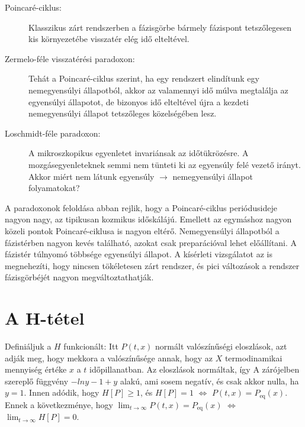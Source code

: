 \begin{description}
    \begin{description}
     \item[Poincaré-ciklus:] Klasszikus zárt rendszerben a fázisgörbe bármely fázispont tetszőlegesen kis környezetébe visszatér elég idő elteltével. 
     \item[Zermelo-féle visszatérési paradoxon:] Tehát a Poincaré-ciklus szerint, ha egy rendszert elindítunk egy nemegyensúlyi állapotból, akkor az valamennyi idő múlva megtalálja az egyensúlyi állapotot, de bizonyos idő elteltével újra a kezdeti nemegyensúlyi állapot tetszőleges közelségében lesz. 
     \item[Loschmidt-féle paradoxon:] A mikroszkopikus egyenletet invariánsak az időtükrözésre.
   A mozgásegyenleteknek semmi nem tünteti ki az egyensúly felé vezető irányt.
   Akkor miért nem látunk egyensúly $\rightarrow$ nemegyensúlyi állapot folyamatokat?
    \end{description}
    
    A paradoxonok feloldása abban rejlik, hogy a Poincaré-ciklus periódusideje nagyon nagy, az tipikusan kozmikus időskálájú.
   Emellett az egymáshoz nagyon közeli pontok Poincaré-ciklusa is nagyon eltérő.
   Nemegyensúlyi állapotból a fázistérben nagyon kevés található, azokat csak preparációval lehet előállítani.
   A fázistér túlnyomó többsége egyensúlyi állapot.
   A kísérleti vizsgálatot az is megnehezíti, hogy nincsen tökéletesen zárt rendszer, és pici változások a rendszer fázisgörbéjét nagyon megváltoztathatják. 
  \end{description}
  
 \section{A H-tétel}
  
  Definiáljuk a $H$ funkcionált:
  Itt $P(t,x)$ normált valószínűségi eloszlások, azt adják meg, hogy mekkora a valószínűsége annak, hogy az $X$ termodinamikai mennyiség értéke $x$ a $t$ időpillanatban.
   Az eloszlások normáltak, így 
  A zárójelben szereplő függvény $-ln y-1+y$ alakú, ami sosem negatív, és csak akkor nulla, ha $y=1$.
   Innen adódik, hogy $H[P]\ge 1$, és $H[P]=1$ $\Leftrightarrow$ $P(t,x)=P_\text{eq}(x)$.
   Ennek a következménye, hogy  $\lim_{t\to\infty}P(t,x)=P_\text{eq}(x)$ $\Leftrightarrow$ $\lim_{t\to\infty}H[P]=0$. 
  
